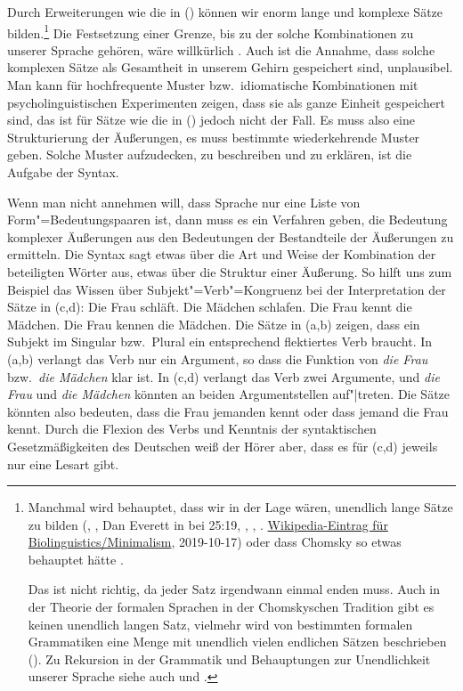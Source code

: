Durch Erweiterungen wie die in () können wir enorm lange und komplexe Sätze bilden.\footnote{
Manchmal wird behauptet, dass wir in der Lage wären, unendlich lange Sätze zu bilden (\citealp*[]{NKN2001a}, \citealp[]{KS2008a-u}, Dan Everett in  bei 25:19,
 \citealp*[]{Chesi2015a-u}, \citealp[]{Lin2017a}, \citealp[]{Martorell2018a}.
 \href{https://en.wikipedia.org/wiki/Biolinguistics\#Minimalist_Program}{Wikipedia-Eintrag für
   Biolinguistics/Minimalism}, 2019-10-17)
 oder dass Chomsky so etwas behauptet hätte \citep[]{Leiss2003a}.

Das ist nicht richtig, da jeder Satz irgendwann einmal enden
 muss. Auch in der Theorie der formalen Sprachen in der Chomskyschen Tradition gibt es keinen
 unendlich langen Satz, vielmehr wird von bestimmten formalen Grammatiken eine Menge mit unendlich
 vielen endlichen Sätzen beschrieben (\citealp[]{Chomsky57a}). Zu Rekursion in
 der Grammatik und Behauptungen zur Unendlichkeit unserer Sprache siehe auch  und
 .
} Die Festsetzung einer Grenze, bis zu der solche Kombinationen zu unserer Sprache gehören, wäre
willkürlich \parencites[]{Harris57a}[]{Chomsky57a}. Auch ist die Annahme, dass
solche komplexen Sätze als Gesamtheit in unserem Gehirn gespeichert sind, unplausibel. Man kann für
hochfrequente Muster bzw.\ idiomatische Kombinationen mit psycholinguistischen Experimenten zeigen,
dass sie als ganze Einheit gespeichert sind, das ist für Sätze wie die in () jedoch nicht der
Fall. Es muss also eine Strukturierung der Äußerungen, es muss bestimmte wiederkehrende Muster
geben. Solche Muster aufzudecken, zu beschreiben und zu erklären, ist die Aufgabe der Syntax.

Wenn man nicht annehmen will, dass Sprache nur eine Liste von Form"=Bedeutungspaaren
ist, dann muss es ein Verfahren geben, die Bedeutung komplexer Äußerungen aus
den Bedeutungen der Bestandteile der Äußerungen zu ermitteln.
Die Syntax sagt etwas über die Art und Weise der Kombination der beteiligten
Wörter aus, etwas über die Struktur einer Äußerung.
So hilft uns zum Beispiel das Wissen über Subjekt"=Verb"=Kongruenz bei der Interpretation
der Sätze in (c,d):
\eal
\ex Die Frau schläft.
\ex Die Mädchen schlafen.
\ex Die Frau kennt  die Mädchen.
\ex Die Frau kennen die Mädchen.
\zl
Die Sätze in (a,b) zeigen, dass ein Subjekt im Singular bzw.\ Plural
ein entsprechend flektiertes Verb braucht. In (a,b) verlangt das Verb nur ein
Argument, so dass die Funktion von \emph{die Frau} bzw.\ \emph{die Mädchen} klar ist.
In (c,d) verlangt das Verb zwei Argumente, und \emph{die Frau} und \emph{die Mädchen}
könnten an beiden Argumentstellen auf"|treten. Die Sätze könnten also bedeuten, dass
die Frau jemanden kennt oder dass jemand die Frau kennt. Durch die Flexion des Verbs und
Kenntnis der syntaktischen Gesetzmäßigkeiten des Deutschen weiß der Hörer
aber, dass es für (c,d) jeweils nur eine Lesart gibt.



